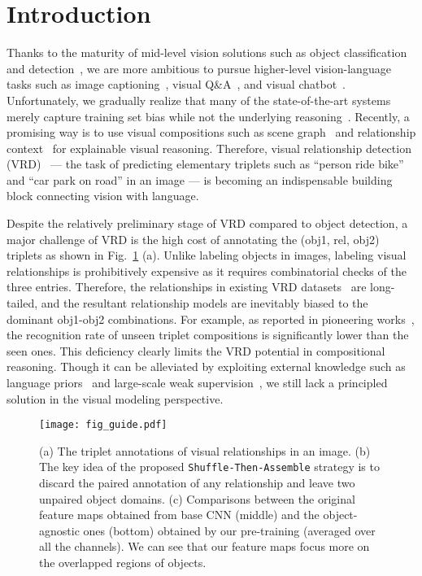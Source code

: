 \documentclass[runningheads]{llncs}
\begin{document}
\section{Introduction}
Thanks to the maturity of mid-level vision solutions such as object classification and detection~\cite{he2016deep,redmon2016yolo9000,gu2015recent}, we are more ambitious to pursue higher-level vision-language tasks such as image captioning~\cite{gu2017stack,gu2017empirical,chen2017sca,liu2018contextaware}, visual Q\&A~\cite{jabri2016revisiting,li2018vqa,gurari2018vizwiz}, and visual chatbot~\cite{das2017visual}. Unfortunately, we gradually realize that many of the state-of-the-art systems merely capture training set bias while not the underlying reasoning~\cite{vinyals2017show,jabri2016revisiting,zhou2015simple}. Recently, a promising way is to use visual compositions such as scene graph~\cite{johnson2015image,xu2017scene} and relationship context~\cite{hu2016modeling,zhang2018grounding} for explainable visual reasoning. Therefore, visual relationship detection (VRD)~\cite{zhang2017visual,zhang2017ppr,li2017vip,yin2018zoom} --- the task of predicting elementary triplets such as ``person ride bike'' and ``car park on road'' in an image --- is becoming an indispensable building block connecting vision with language.

Despite the relatively preliminary stage of VRD compared to object detection, a major challenge of VRD is the high cost of annotating the (obj1, rel, obj2) triplets as shown in Fig.~\ref{fig:1} (a). Unlike labeling objects in images, labeling visual relationships is prohibitively expensive as it requires combinatorial checks of the three entries. Therefore, the relationships in existing VRD datasets~\cite{lu2016visual,krishna2017visual} are long-tailed, and the resultant relationship models are inevitably biased to the dominant obj1-obj2 combinations. For example, as reported in pioneering works~\cite{zhang2017visual,lu2016visual}, the recognition rate of unseen triplet compositions is significantly lower than the seen ones. This deficiency clearly limits the VRD potential in compositional reasoning. Though it can be alleviated by exploiting external knowledge such as language priors~\cite{lu2016visual} and large-scale weak supervision~\cite{zhang2017ppr}, we still lack a principled solution in the visual modeling perspective.


\begin{figure}[t!]
\centering
\texttt{[image: fig\_guide.pdf]}
\caption{(a) The triplet annotations of visual relationships in an image. (b) The key idea of the proposed \texttt{Shuffle-Then-Assemble} strategy is to discard the paired annotation of any relationship and leave two unpaired object domains. (c) Comparisons between the original feature maps obtained from base CNN (middle) and the object-agnostic ones (bottom) obtained by our pre-training (averaged over all the channels). We can see that our feature maps focus more on the overlapped regions of objects.}
\label{fig:1}
\end{figure}
\end{document}
